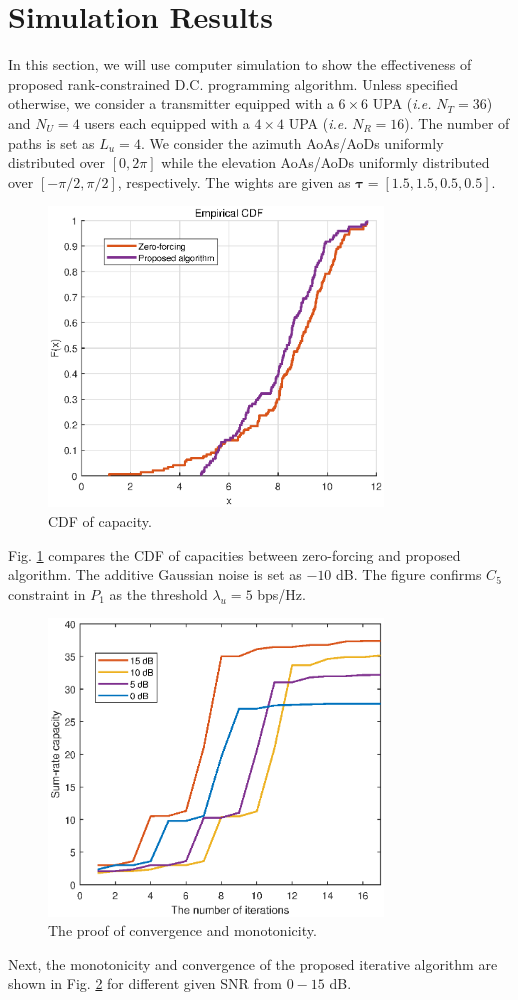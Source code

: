 \documentclass[10pt,journal,twocolumn,twoside]{IEEEtran}
\begin{document}
\section{Simulation Results}
In this section, we will use computer simulation to show the effectiveness of proposed rank-constrained D.C. programming algorithm. Unless specified otherwise, we consider a transmitter equipped with a $6\times 6$ UPA ({\em i.e.} $N_T=36$) and $N_U=4$ users each equipped with a $4\times 4$ UPA ({\em i.e.} $N_R=16$). The number of paths is set as $L_{u} = 4$. We consider the azimuth AoAs/AoDs uniformly distributed over $[0, 2\pi]$ while the elevation AoAs/AoDs uniformly distributed over $[-\pi/2, \pi/2]$, respectively. The wights are given as   $\bm{\tau} = [1.5,1.5,0.5,0.5]$. 
\begin{figure}[ht]
	\begin{center}
		\includegraphics[width=3.5in]{Figure/ZF_VS_DC.eps}
		\caption{CDF of capacity.}\label{fig:CDF}
	\end{center}
\end{figure}

Fig. \ref{fig:CDF} compares the CDF of capacities between zero-forcing and proposed algorithm. The additive Gaussian noise is set as $-10$ dB. The figure confirms $C_5$ constraint in $P_1$ as the threshold $\lambda_{u} = 5 $ bps/Hz.

\begin{figure}[ht]
	\begin{center}
		\includegraphics[width=3.5in]{Figure/convergence.eps}
		\caption{The proof of convergence and monotonicity.}\label{fig:mono}
	\end{center}
\end{figure}

Next, the monotonicity and convergence of the proposed iterative algorithm are shown in Fig. \ref{fig:mono} for different given SNR from $0-15$ dB.





\end{document}
